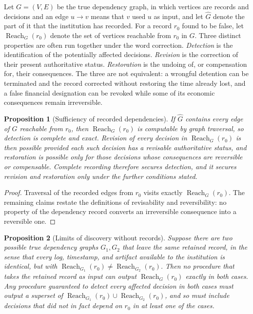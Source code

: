 \documentclass[11pt]{article}
\theoremstyle{plain}
\newtheorem{proposition}{Proposition}
\theoremstyle{definition}
\theoremstyle{remark}
\newcommand{\Reach}{\operatorname{Reach}}
\begin{document}
Let $G=(V,E)$ be the true dependency graph, in which vertices are records and decisions and an edge $u\to v$ means that $v$ used $u$ as input, and let $\hat G$ denote the part of it that the institution has recorded. For a record $r_0$ found to be false, let $\Reach_G(r_0)$ denote the set of vertices reachable from $r_0$ in $G$. Three distinct properties are often run together under the word correction. \emph{Detection} is the identification of the potentially affected decisions. \emph{Revision} is the correction of their present authoritative status. \emph{Restoration} is the undoing of, or compensation for, their consequences. The three are not equivalent: a wrongful detention can be terminated and the record corrected without restoring the time already lost, and a false financial designation can be revoked while some of its economic consequences remain irreversible.

\begin{proposition}[Sufficiency of recorded dependencies]\label{prop:corrsuff}
If $\hat G$ contains every edge of $G$ reachable from $r_0$, then $\Reach_G(r_0)$ is computable by graph traversal, so detection is complete and exact. Revision of every decision in $\Reach_G(r_0)$ is then possible provided each such decision has a revisable authoritative status, and restoration is possible only for those decisions whose consequences are reversible or compensable. Complete recording therefore secures detection, and it secures revision and restoration only under the further conditions stated.
\end{proposition}

\begin{proof}
Traversal of the recorded edges from $r_0$ visits exactly $\Reach_G(r_0)$. The remaining claims restate the definitions of revisability and reversibility: no property of the dependency record converts an irreversible consequence into a reversible one.
\end{proof}

\begin{proposition}[Limits of discovery without records]\label{prop:corrlimit}
Suppose there are two possible true dependency graphs $G_1,G_2$ that leave the same retained record, in the sense that every log, timestamp, and artifact available to the institution is identical, but with $\Reach_{G_1}(r_0)\neq\Reach_{G_2}(r_0)$. Then no procedure that takes the retained record as input can output $\Reach_G(r_0)$ exactly in both cases. Any procedure guaranteed to detect every affected decision in both cases must output a superset of $\Reach_{G_1}(r_0)\cup\Reach_{G_2}(r_0)$, and so must include decisions that did not in fact depend on $r_0$ in at least one of the cases.
\end{proposition}
\end{document}
